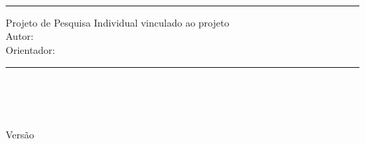 
  \thispagestyle{empty}


    \begin{minipage}{0.6\textwidth}
      \begin{flushleft}
          \sffamily
          \vspace{2.6cm}          
          \LARGE \textbf{\ppitipo} \\
          \footnotesize \textcolor{black!60}{\ppiid} \\
          \Huge \textbf{\projpesq} \\
      \end{flushleft}
    \end{minipage}%

    \vspace{3cm}
    \begin{minipage}{0.6\textwidth}
          \sffamily
          
          \rule{\textwidth}{0.2mm}
          Projeto de Pesquisa Individual vinculado ao projeto \projeto \\[0.5cm]
          Autor: \textbf{\pesquisador} \\
          Orientador: \textbf{\Orientador} \\[-0.2cm]
          \rule{\textwidth}{0.2mm}\\
    \end{minipage}%
    
    \vfill
    \begin{minipage}{0.6\textwidth}
       \ppilocal \\[0.2cm]
       \ppidata \\[0.2cm]
       \tiny Versão \ppiversao \\
    \end{minipage}%
